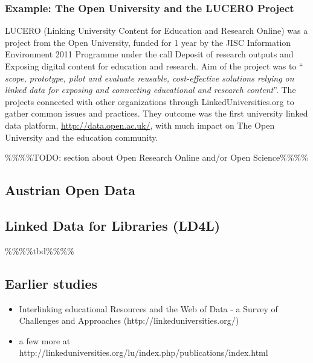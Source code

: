 \subsubsection{Example: The Open University and the LUCERO Project}
LUCERO (Linking University Content for Education and Research Online) was a project from the Open University, funded for 1 year by the JISC Information Environment 2011 Programme under the call Deposit of research outputs and Exposing digital content for education and research. Aim of the project was to "` \textit{ scope, prototype, pilot and evaluate reusable, cost-effective solutions relying on linked data for exposing and connecting educational and research content}"'.\cite{url:lucero} The projects connected with other organizations through LinkedUniversities.org to gather common issues and practices. They outcome was the first university linked data platform, \url{http://data.open.ac.uk/}, with much impact on The Open University and the education community.

\%\%\%\%TODO: section about Open Research Online and/or Open Science\%\%\%\%

\subsection{Austrian Open Data}
\subsection{Linked Data for Libraries (LD4L)\label{ld-libraries}}

\%\%\%\%tbd\%\%\%\%

\subsection{Earlier studies}
\begin{itemize}
	\item Interlinking educational Resources and the Web of Data - a Survey of Challenges and Approaches (http://linkeduniversities.org/)
	\item a few more at http://linkeduniversities.org/lu/index.php/publications/index.html
	
	
\end{itemize}